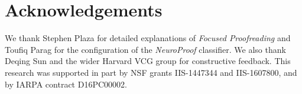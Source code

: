 
\section*{Acknowledgements}
We thank Stephen Plaza for detailed explanations of \emph{Focused Proofreading} and Toufiq Parag for the configuration of the \emph{NeuroProof} classifier. We also thank Deqing Sun and the wider Harvard VCG group for constructive feedback. This research was supported in part by NSF grants IIS-1447344 and IIS-1607800, and by IARPA contract D16PC00002.

